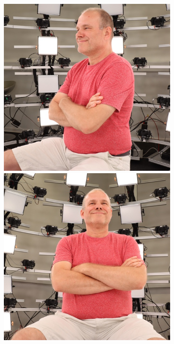 \begin{figure}
	\centering
	\begin{subfigure}{0.48\linewidth}
		\includegraphics[width=\textwidth]{Figures/unpreprocessed/0-1-5-1-294_210300_834.JPG}
        \includegraphics[width=\textwidth]{Figures/unpreprocessed/0-2-6-2-303_210300_871.JPG}

\end{subfigure}
\end{figure}
